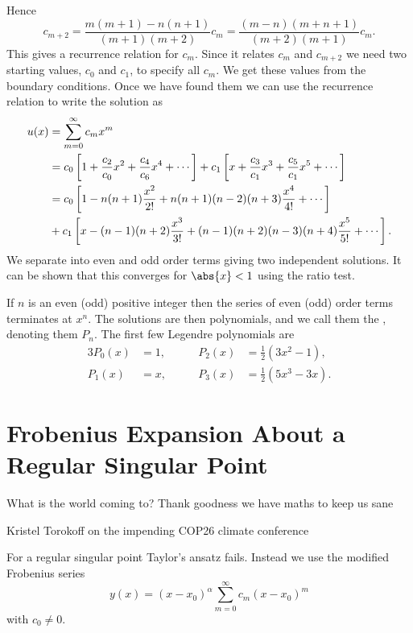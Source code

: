 \documentclass[fleqn]{NotesClass}
\begin{document}
    Hence
    \begin{equation}
        c_{m+2} = \frac{m(m + 1) - n(n + 1)}{(m + 1)(m + 2)} c_m = \frac{(m - n)(m + n + 1)}{(m + 2)(m + 1)}c_m.
    \end{equation}
    This gives a recurrence relation for \(c_m\).
    Since it relates \(c_m\) and \(c_{m+2}\) we need two starting values, \(c_0\) and \(c_1\), to specify all \(c_m\).
    We get these values from the boundary conditions.
    Once we have found them we can use the recurrence relation to write the solution as
    \begin{align}
        u(x) &= \sum_{m=0}^{\infty} c_mx^m\\
        &= c_0\left[ 1 + \frac{c_2}{c_0}x^2 + \frac{c_4}{c_6}x^{4} + \dotsb \right] + c_1\left[ x + \frac{c_3}{c_1}x^3 + \frac{c_5}{c_1}x^5 + \dotsb \right]\\
        &= c_0 \left[ 1 - n(n + 1)\frac{x^2}{2!} + n(n + 1)(n - 2)(n + 3)\frac{x^4}{4!} + \dotsb \right]\\
        &+ c_1\left[ x - (n - 1)(n + 2)\frac{x^3}{3!} + (n - 1)(n + 2)(n - 3)(n + 4)\frac{x^5}{5!} + \dotsb \right].\notag
    \end{align}
    We separate into even and odd order terms giving two independent solutions.
    It can be shown that this converges for \(\abs{x} < 1\) using the ratio test.
    
    If \(n\) is an even (odd) positive integer then the series of even (odd) order terms terminates at \(x^{n}\).
    The solutions are then polynomials, and we call them the , denoting them \(P_n\).
    The first few Legendre polynomials are
    \begin{alignat}{3}
        P_0(x) &= 1, \qquad & P_2(x) &= \frac{1}{2}(3x^2 - 1),\\
        P_1(x) &= x, \qquad & P_3(x) &= \frac{1}{2}(5x^3 - 3x).
    \end{alignat}
    
    \section{Frobenius Expansion About a Regular Singular Point}
    \epigraph{What is the world coming to? Thank goodness we have maths to keep us sane}{Kristel Torokoff on the impending COP26 climate conference}
    For a regular singular point Taylor's ansatz fails.
    Instead we use the modified Frobenius series
    \begin{equation}
        y(x) = (x - x_0)^{\alpha} \sum_{m=0}^{\infty} c_m(x - x_0)^m
    \end{equation}
    with \(c_0 \ne 0\).
    
\end{document}
